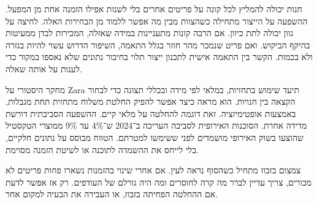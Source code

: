 
{\fontsize{12.3}{17.9}\selectfont

חנות יכולה להמליץ לכל קונה על פריטים אחרים בלי לשנות אפילו הזמנה אחת מן המפעל. ההשפעה על הייצור מתחילה כשהצוות מבין מה אפשר ללמוד מן הבחירות האלה. לחיצה על גוון יכולה לתת כיוון. אם הרבה קונות מתעניינות במידה שאזלה, המכירות לבדן ממעיטות בהיקף הביקוש. ואם פריט שנמכר מהר חוזר בגלל התאמה, השיפור הדרוש עשוי להיות בגזרה ולא בכמות. הקשר בין התאמה אישית לתכנון ייצור תלוי בחיבור נתונים שלא נאספו במקור כדי לענות על אותה שאלה.

מחקר היסטורי על \textenglish{Zara} תיעד שימוש בתחזיות, במלאי לפי מידה ובכללי תצוגה כדי לבחור הקצאה בין חנויות. הוא מראה כיצד אפשר להפיק החלטת משלוח מתחזית תחת מגבלות, באמצעות אופטימיזציה. זאת דוגמה להחלטה על מלאי קיים. ההשפעה הסביבתית דורשת מדידה אחרת. הסוכנות האירופית לסביבה העריכה ב־2024 ש־4\% עד 9\% ממוצרי הטקסטיל שהוצעו בשוק האירופי מושמדים לפני ששימשו למטרתם. הטווח מבוסס על נתונים חלקיים, בלי לייחס את ההשמדה לתוכנה או לשיטת הזמנה מסוימת. 

\par}



\vspace{3mm}


{\fontsize{12.3}{17.9}\selectfont

צמצום בזבוז מתחיל כשהסוף נראה לעין. אם אחרי שינוי בהזמנות נשארו פחות פריטים לא מכורים, צריך עדיין לברר מה קרה לחוסרים ומה היה גורלם של העודפים. רק אז אפשר לדעת אם ההחלטה הפחיתה בזבוז, או העבירה את הבעיה למקום אחר.

\par}
